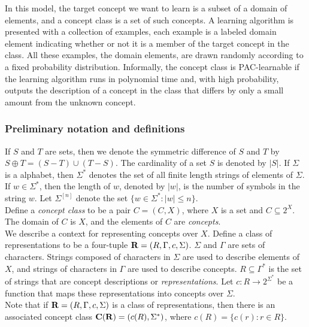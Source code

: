 \documentclass[12pt]{article}
\begin{document}
In this model, the target concept we want to learn is a subset of a domain of elements, and a concept class is a set of such concepts. A learning algorithm is presented with a collection of examples, each example is a labeled domain element indicating whether or not it is a member of the target concept in the class. All these examples, the domain elements, are drawn randomly according to a fixed probability distribution. Informally, the concept class is PAC-learnable if the learning algorithm runs in polynomial time and, with high probability, outputs the description of a concept in the class that differs by only a small amount from the unknown concept.

\subsubsection{Preliminary notation and definitions}

If $S$ and $T$ are sets, then we denote the symmetric difference of $S$ and $T$ by $S \oplus T = (S - T) \cup (T - S)$. The cardinality of a set $S$ is denoted by $|S|$. If $\Sigma$ is a alphabet, then $\Sigma^*$ denotes the set of all finite length strings of elements of $\Sigma$. If $w \in \Sigma^*$, then the length of $w$, denoted by $|w|$, is the number of symbols in the string $w$. Let $\Sigma^{[n]}$ denote the set $\{ w \in \Sigma^*: |w| \le n \}$. \\

Define a \emph {concept class} to be a pair $C = (C,X)$, where $X$ is a set and $C \subseteq 2^X$. The domain of $C$ is $X$, and the elements of $C$ are \emph {concepts}. \\

We describe a context for representing concepts over $X$. Define a class of representations to be a four-tuple ${\bf R} = (R, \Gamma, c, \Sigma)$. $\Sigma$ and $\Gamma$ are sets of characters. Strings composed of characters in $\Sigma$ are used to describe elements of $X$, and strings of characters in $\Gamma$ are used to describe concepts. $R \subseteq \Gamma^*$ is the set of strings that are concept descriptions or \emph {representations}. Let $c: R \rightarrow 2^{\Sigma^*}$ be a function that maps these representations into concepts over $\Sigma$. \\

Note that if ${\bf R} = (R, \Gamma, c, \Sigma)$ is a class of representations, then there is an associated concept class ${\bf C(R)} = (c(R), \Sigma^*)$, where $c(R) = \{ c(r): r \in R \}$. \\
\end{document}

